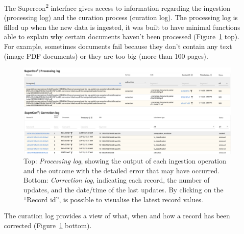 The Supercon\textsuperscript{2} interface gives access to information regarding the ingestion (processing log) and the curation process (curation log). 
The processing log is filled up when the new data is ingested, it was built to have minimal functions able to explain why certain documents haven't been processed (Figure~\ref{fig:processing-curation-log} top). 
For example, sometimes documents fail because they don't contain any text (image PDF documents) or they are too big (more than 100 pages). 

\begin{figure}[htbp]
  \centering
  \includegraphics[width=1\textwidth]{figures/curation/processing-curation-log.png} 
  \caption{Top: \textit{Processing log}, showing the output of each ingestion operation and the outcome with the detailed error that may have occurred. Bottom: \textit{Correction log}, indicating each record, the number of updates, and the date/time of the last updates. By clicking on the ``Record id'', is possible to visualise the latest record values.}
  \label{fig:processing-curation-log}
\end{figure}

The curation log provides a view of what, when and how a record has been corrected (Figure~\ref{fig:processing-curation-log} bottom).



